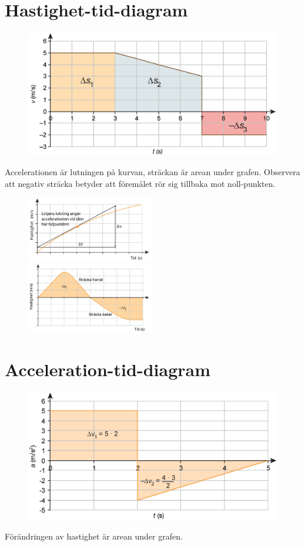 \documentclass[11pt]{article}
\begin{document}
    \section{Hastighet-tid-diagram}
    \begin{figure}[!h]
        \includegraphics[width=\textwidth]{images/chapter3/velocityTime.png}
    \end{figure}
    Accelerationen är lutningen på kurvan, sträckan är arean under grafen. Observera att negativ sträcka betyder att
    föremålet rör sig tillbaka mot noll-punkten.
    \begin{figure}[!h]
        \includegraphics[width=0.5\textwidth]{images/chapter3/velocityTimeAcceleration.png}
        \includegraphics[width=0.5\textwidth]{images/chapter3/velocityTimeDist.png}
    \end{figure}
    \clearpage
    \section{Acceleration-tid-diagram}
    \begin{figure}[!h]
        \includegraphics[width=\textwidth]{images/chapter3/accelerationTime.png}
    \end{figure}
    Förändringen av hastighet är arean under grafen.
    \clearpage
\end{document}
